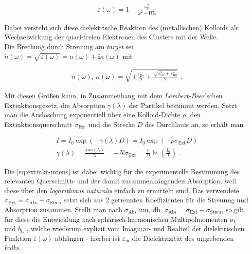 \documentclass[numbers=noenddot,a4paper,notitlepage,twoside,BCOR15mm]{scrartcl}
\newcommand{\ix}[1]{_\text{#1}}
\newcommand{\imag}{\mathbf{i}}
\newcommand{\tilt}[1]{\textit{#1}}
\begin{document}
				\begin{align}
					\varepsilon\left(\omega\right)=1-\frac{\omega\ix{P}^2}{\omega^2-\imag\Gamma\omega}
				\end{align}

				Dabei versteht sich diese dielektrische Reaktion des (metallischen) Kolloids als Wechselwirkung der quasi-freien Elektronen des Clusters mit der Welle.\\
				Die Brechung durch Streuung am \tilt{target} sei $\tilde{n}\left(\omega\right)=\sqrt{\varepsilon\left(\omega\right)}=n\left(\omega\right)+\imag\kappa\left(\omega\right)$ mit

					\begin{align}
						n\left(\omega\right),\, \kappa\left(\omega\right)= \sqrt{\pm\frac{\varepsilon\ix{Re}}{2}+\frac{\sqrt{\varepsilon\ix{Re}^2+\varepsilon\ix{Im}^2}}{2}}\,\,. \label{eq:kappan}
					\end{align}

				Mit diesen Größen kann, in Zusammenhang mit dem \tilt{Lambert-Beer}'schen Extinktionsgesetz, die Absorption $\gamma\left(\lambda\right)$ der Partikel bestimmt werden. Setzt man die Auslöschung exponentiell über eine Kolloid-Dichte $\rho$, den Extinktionsquerschnitt $\sigma\ix{Ext}$ und die Strecke $D$ des Durchlaufs an, so erhält man

				\begin{align}
					I=I\ix{0}\exp\left(-\gamma\left(\lambda\right)D\right)=I\ix{0}\exp\left(-\rho\sigma\ix{Ext}D\right) \\
					\gamma\left(\lambda\right)=\frac{4\pi\kappa\left(\lambda\right)}{\lambda}=-N\sigma\ix{Ext}=\frac{1}{D}\ln\left(\frac{I\ix{0}}{I}\right) \label{eq:extinkt-intens} \,\,.
				\end{align}

			Die \autoref{eq:extinkt-intens} ist dabei wichtig für die experimentelle Bestimmung des relevanten Querschnitts und der damit zusammenhängenden Absorption, weil diese über den \tilt{logarithmus naturalis} einfach zu ermitteln sind. Das verwendete $\sigma\ix{Ext}=\sigma\ix{Abs}+\sigma\ix{Streu}$ setzt sich aus 2 getrennten Koeffizienten für die Streuung und Absorption zusammen. Stellt man nach $\sigma\ix{Abs}$ um, dh. $\sigma\ix{Abs}=\sigma\ix{Ext}-\sigma\ix{Streu}$, so gilt für diese die Entwicklung nach sphärisch-harmonischen Multipolmomenten $a\ix{L}$ und $b\ix{L}$ , welche wiederum explizit vom Imaginär- und Realteil der dielektrischen Funktion $\varepsilon\left(\omega\right)$ abhängen - hierbei ist $\varepsilon\ix{m}$ die Dielektrizität des umgebenden \tilt{bulks}.
\end{document}
